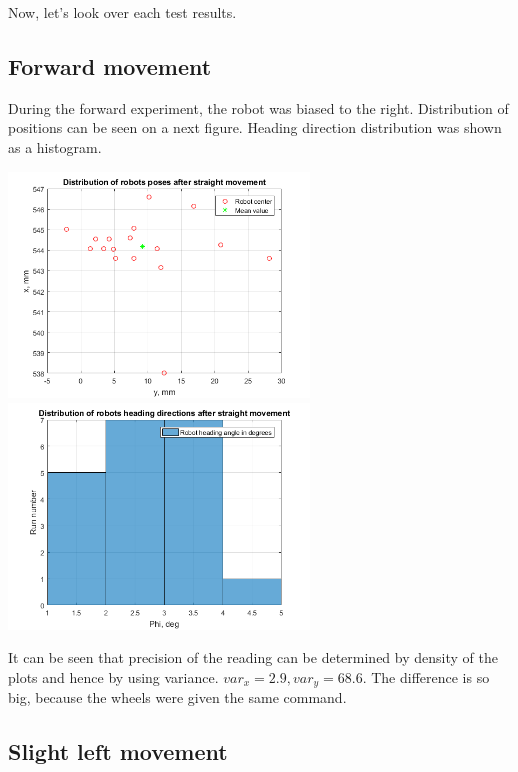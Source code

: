 \documentclass[a4paper, 12pt]{article}
\begin{document}
Now, let's look over each test results.

\newpage
\subsection{Forward movement}
During the forward experiment, the robot was biased to the right. Distribution of positions can be seen on a next figure. Heading direction distribution was shown as a histogram.

\begin{center}
  \includegraphics[width=0.6\textwidth]{s}
  \includegraphics[width=0.6\textwidth]{sphi}
\end{center}

It can be seen that precision of the reading can be determined by density of the plots and hence by using variance. $var_x = 2.9,var_y = 68.6$. The difference is so big, because the wheels were given the same command.
\newpage

\subsection{Slight left movement}
\end{document}
